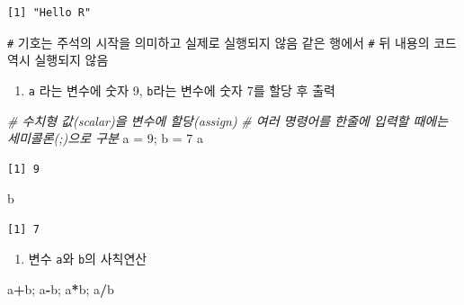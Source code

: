 \documentclass[
  11pt,
]{krantz}
\makeatletter
\newenvironment{Shaded}{\begin{snugshade}}{\end{snugshade}}
\newcommand{\CommentTok}[1]{\textcolor[rgb]{0.37,0.37,0.37}{\textit{#1}}}
\newcommand{\DecValTok}[1]{\textcolor[rgb]{0.06,0.06,0.06}{#1}}
\newcommand{\NormalTok}[1]{#1}
\newcommand{\OperatorTok}[1]{\textcolor[rgb]{0.43,0.43,0.43}{\textbf{#1}}}
\newcommand{\StringTok}[1]{\textcolor[rgb]{0.5,0.5,0.5}{#1}}
\providecommand{\tightlist}{%
  \setlength{\itemsep}{0pt}\setlength{\parskip}{0pt}}
\newenvironment{kframe}{%
\medskip{}
\setlength{\fboxsep}{.8em}
 \def\at@end@of@kframe{}%
 \ifinner\ifhmode%
  \def\at@end@of@kframe{\end{minipage}}%
  \begin{minipage}{\columnwidth}%
 \fi\fi%
 \def\FrameCommand##1{\hskip\@totalleftmargin \hskip-\fboxsep
 \colorbox{shadecolor}{##1}\hskip-\fboxsep
     \hskip-\linewidth \hskip-\@totalleftmargin \hskip\columnwidth}%
 \MakeFramed {\advance\hsize-\width
   \@totalleftmargin\z@ \linewidth\hsize
   \@setminipage}}%
 {\par\unskip\endMakeFramed%
 \at@end@of@kframe}
\renewenvironment{quote}{\begin{kframe}}{\end{kframe}}
\makeatother
\begin{document}
\begin{verbatim}
[1] "Hello R"
\end{verbatim}

\normalsize

\begin{quote}
\texttt{\#} 기호는 주석의 시작을 의미하고 실제로 실행되지 않음 같은 행에서 \texttt{\#} 뒤 내용의 코드 역시 실행되지 않음
\end{quote}

\begin{enumerate}
\def\labelenumi{\arabic{enumi}.}
\setcounter{enumi}{2}
\tightlist
\item
  \texttt{a} 라는 변수에 숫자 9, \texttt{b}라는 변수에 숫자 7를 할당 후 출력
\end{enumerate}

\footnotesize

\begin{Shaded}
\begin{Highlighting}[]
\CommentTok{# 수치형 값(scalar)을 변수에 할당(assign)}
\CommentTok{# 여러 명령어를 한줄에 입력할 때에는 세미콜론(;)으로 구분}
\NormalTok{a =}\StringTok{ }\DecValTok{9}\NormalTok{; b =}\StringTok{ }\DecValTok{7}
\NormalTok{a}
\end{Highlighting}
\end{Shaded}

\begin{verbatim}
[1] 9
\end{verbatim}

\begin{Shaded}
\begin{Highlighting}[]
\NormalTok{b}
\end{Highlighting}
\end{Shaded}

\begin{verbatim}
[1] 7
\end{verbatim}

\normalsize

\begin{enumerate}
\def\labelenumi{\arabic{enumi}.}
\setcounter{enumi}{3}
\tightlist
\item
  변수 \texttt{a}와 \texttt{b}의 사칙연산
\end{enumerate}

\footnotesize

\begin{Shaded}
\begin{Highlighting}[]
\NormalTok{a}\OperatorTok{+}\NormalTok{b; a}\OperatorTok{-}\NormalTok{b; a}\OperatorTok{*}\NormalTok{b; a}\OperatorTok{/}\NormalTok{b}
\end{Highlighting}
\end{Shaded}
\end{document}
